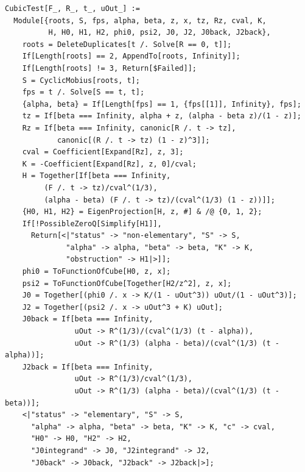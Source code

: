 \documentclass[11pt,a4paper]{article}
\theoremstyle{plain}
\theoremstyle{definition}
\theoremstyle{remark}
\begin{document}
\begin{lstlisting}
CubicTest[F_, R_, t_, uOut_] :=
  Module[{roots, S, fps, alpha, beta, z, x, tz, Rz, cval, K,
          H, H0, H1, H2, phi0, psi2, J0, J2, J0back, J2back},
    roots = DeleteDuplicates[t /. Solve[R == 0, t]];
    If[Length[roots] == 2, AppendTo[roots, Infinity]];
    If[Length[roots] != 3, Return[$Failed]];
    S = CyclicMobius[roots, t];
    fps = t /. Solve[S == t, t];
    {alpha, beta} = If[Length[fps] == 1, {fps[[1]], Infinity}, fps];
    tz = If[beta === Infinity, alpha + z, (alpha - beta z)/(1 - z)];
    Rz = If[beta === Infinity, canonic[R /. t -> tz],
            canonic[(R /. t -> tz) (1 - z)^3]];
    cval = Coefficient[Expand[Rz], z, 3];
    K = -Coefficient[Expand[Rz], z, 0]/cval;
    H = Together[If[beta === Infinity,
         (F /. t -> tz)/cval^(1/3),
         (alpha - beta) (F /. t -> tz)/(cval^(1/3) (1 - z))]];
    {H0, H1, H2} = EigenProjection[H, z, #] & /@ {0, 1, 2};
    If[!PossibleZeroQ[Simplify[H1]],
      Return[<|"status" -> "non-elementary", "S" -> S,
              "alpha" -> alpha, "beta" -> beta, "K" -> K,
              "obstruction" -> H1|>]];
    phi0 = ToFunctionOfCube[H0, z, x];
    psi2 = ToFunctionOfCube[Together[H2/z^2], z, x];
    J0 = Together[(phi0 /. x -> K/(1 - uOut^3)) uOut/(1 - uOut^3)];
    J2 = Together[(psi2 /. x -> uOut^3 + K) uOut];
    J0back = If[beta === Infinity,
                uOut -> R^(1/3)/(cval^(1/3) (t - alpha)),
                uOut -> R^(1/3) (alpha - beta)/(cval^(1/3) (t - alpha))];
    J2back = If[beta === Infinity,
                uOut -> R^(1/3)/cval^(1/3),
                uOut -> R^(1/3) (alpha - beta)/(cval^(1/3) (t - beta))];
    <|"status" -> "elementary", "S" -> S,
      "alpha" -> alpha, "beta" -> beta, "K" -> K, "c" -> cval,
      "H0" -> H0, "H2" -> H2,
      "J0integrand" -> J0, "J2integrand" -> J2,
      "J0back" -> J0back, "J2back" -> J2back|>];


\end{lstlisting}
\end{document}
